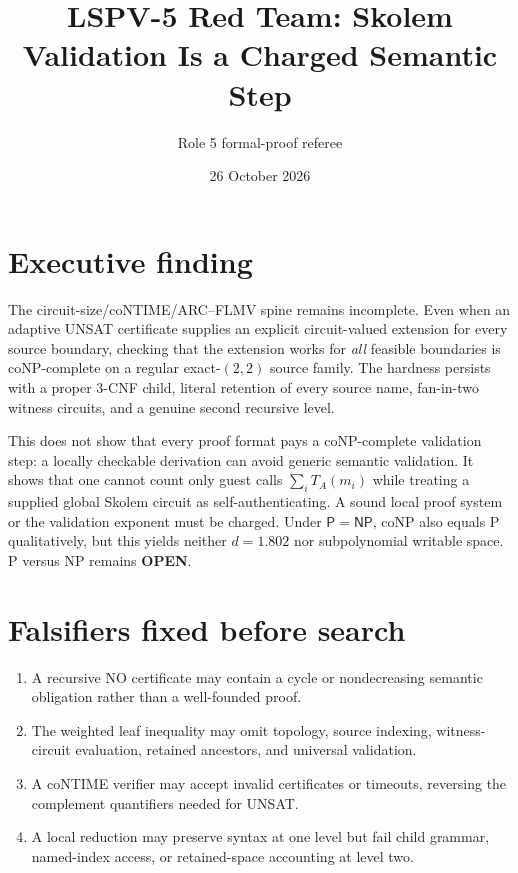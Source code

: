 \documentclass[11pt]{article}
\title{LSPV-5 Red Team: Skolem Validation Is a Charged Semantic Step}
\author{Role 5 formal-proof referee}
\date{26 October 2026}
\newcommand{\status}[1]{\textbf{#1}}
\begin{document}
\maketitle

\section*{Executive finding}
The circuit-size/coNTIME/ARC--FLMV spine remains incomplete.  Even when an
adaptive UNSAT certificate supplies an explicit circuit-valued extension for
every source boundary, checking that the extension works for \emph{all}
feasible boundaries is coNP-complete on a regular exact-$(2,2)$ source family.
The hardness persists with a proper 3-CNF child, literal retention of every
source name, fan-in-two witness circuits, and a genuine second recursive level.

This does not show that every proof format pays a coNP-complete validation
step: a locally checkable derivation can avoid generic semantic validation.
It shows that one cannot count only guest calls $\sum_iT_A(m_i)$ while treating
a supplied global Skolem circuit as self-authenticating.  A sound local proof
system or the validation exponent must be charged.  Under
$\mathsf P=\mathsf{NP}$, coNP also equals P qualitatively, but this yields
neither $d=1.802$ nor subpolynomial writable space.  P versus NP remains
\status{OPEN}.

\section*{Falsifiers fixed before search}
\begin{enumerate}
\item A recursive NO certificate may contain a cycle or nondecreasing semantic
      obligation rather than a well-founded proof.
\item The weighted leaf inequality may omit topology, source indexing,
      witness-circuit evaluation, retained ancestors, and universal validation.
\item A coNTIME verifier may accept invalid certificates or timeouts, reversing
      the complement quantifiers needed for UNSAT.
\item A local reduction may preserve syntax at one level but fail child grammar,
      named-index access, or retained-space accounting at level two.
\end{enumerate}
\end{document}
